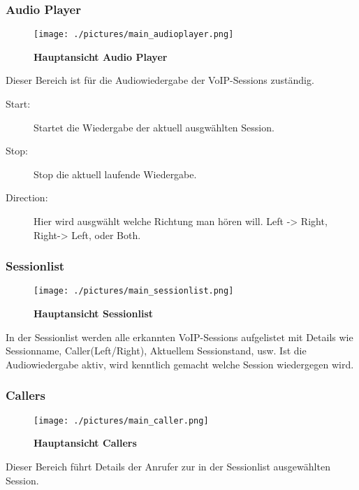 \documentclass[a4,12pt]{scrartcl}
\begin{document}
\subsubsection{Audio Player}
\begin{figure} [H]
	\begin{center}
	\texttt{[image: ./pictures/main\_audioplayer.png]}
	\caption{\textbf{Hauptansicht Audio Player}}
	\label{Hauptansicht Audio Player}
	\end{center}
\end{figure}
Dieser Bereich ist für die Audiowiedergabe der VoIP-Sessions zuständig.
\begin{description}
\item [Start:]
Startet die Wiedergabe der aktuell ausgwählten Session.
\item [Stop:]
Stop die aktuell laufende Wiedergabe.
\item [Direction:]
Hier wird ausgwählt welche Richtung man hören will. \grqq{}Left -> Right\grqq{}, \grqq{}Right-> Left\grqq{}, oder \grqq{}Both\grqq{}.

\end{description}

\subsubsection{Sessionlist}
\begin{figure} [H]
	\begin{center}
	\texttt{[image: ./pictures/main\_sessionlist.png]}
	\caption{\textbf{Hauptansicht Sessionlist}}
	\label{Hauptansicht Sessionlist}
	\end{center}
\end{figure}
In der Sessionlist werden alle erkannten VoIP-Sessions aufgelistet mit Details wie Sessionname, Caller(Left/Right), Aktuellem Sessionstand, usw. Ist die Audiowiedergabe aktiv, wird kenntlich gemacht welche Session wiedergegen wird.

\subsubsection{Callers}
\begin{figure} [H]
	\begin{center}
	\texttt{[image: ./pictures/main\_caller.png]}
	\caption{\textbf{Hauptansicht Callers}}
	\label{Hauptansicht Callers}
	\end{center}
\end{figure}
Dieser Bereich führt Details der Anrufer zur in der Sessionlist ausgewählten Session.
\end{document}
